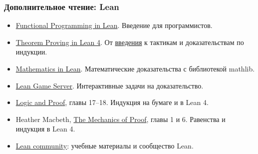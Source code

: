 \documentclass[11pt]{beamer}
\begin{document}
\begin{frame}
  \frametitle{Дополнительное чтение: Lean}
  \small
  \begin{itemize}
    \setlength{\itemsep}{1pt}
    \item \href{https://lean-lang.org/functional_programming_in_lean/}{Functional Programming in Lean}. Введение для программистов.
    \item \href{https://lean-lang.org/theorem_proving_in_lean4/}{Theorem Proving in Lean 4}. От \href{https://lean-lang.org/theorem_proving_in_lean4/Introduction/}{введения} к тактикам и доказательствам по индукции.
    \item \href{https://leanprover-community.github.io/mathematics_in_lean/}{Mathematics in Lean}. Математические доказательства с библиотекой mathlib.
    \item \href{https://adam.math.hhu.de/}{Lean Game Server}. Интерактивные задачи на доказательство.
    \item \href{https://leanprover-community.github.io/logic_and_proof/}{Logic and Proof}, главы 17--18. Индукция на бумаге и в Lean 4.
    \item Heather Macbeth, \href{https://hrmacbeth.github.io/math2001/}{The Mechanics of Proof}, главы 1 и 6. Равенства и индукция в Lean 4.
    \item \href{https://leanprover-community.github.io/}{Lean community}: учебные материалы и сообщество Lean.
  \end{itemize}
\end{frame}
\end{document}
